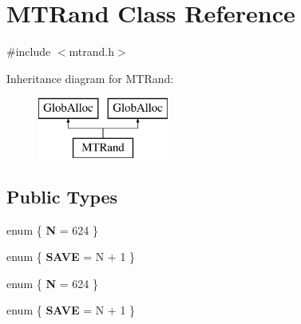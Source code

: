 \hypertarget{classMTRand}{\section{M\-T\-Rand Class Reference}
\label{classMTRand}
}


{\ttfamily \#include $<$mtrand.\-h$>$}

Inheritance diagram for M\-T\-Rand\-:\begin{figure}[H]
\begin{center}
\leavevmode
\includegraphics[height=2.000000cm]{classMTRand}
\end{center}
\end{figure}
\subsection*{Public Types}
\begin{DoxyCompactItemize}
\item 
enum \{ {\bfseries N} = 624
 \}
\item 
enum \{ {\bfseries S\-A\-V\-E} = N + 1
 \}
\item 
enum \{ {\bfseries N} = 624
 \}
\item 
enum \{ {\bfseries S\-A\-V\-E} = N + 1
 \}
\end{DoxyCompactItemize}
